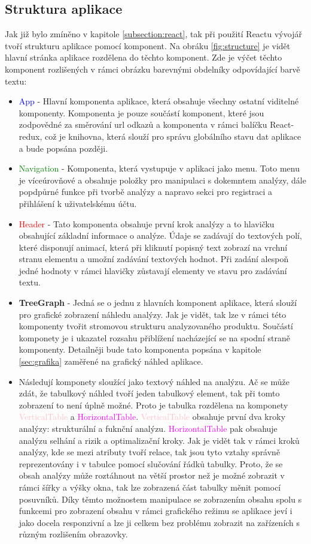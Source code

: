 \subsection{Struktura aplikace}
Jak již bylo zmíněno v kapitole \ref{subsection:react}, tak při použití Reactu vývojář tvoří strukturu aplikace pomocí komponent. Na obráku \ref{fig:structure} je vidět hlavní stránka aplikace rozdělena do těchto komponent. Zde je výčet těchto komponent rozlišených v rámci obrázku barevnými obdelníky odpovídající barvě textu: 

\begin{itemize}
    \item \textcolor{blue}{App} - Hlavní komponenta aplikace, která obsahuje všechny ostatní viditelné komponenty. Komponenta je pouze součástí komponent, které jsou zodpovědné za směrování url odkazů a komponenta v rámci balíčku React-redux, což je knihovna, která slouží pro správu globálního stavu dat aplikace a bude popsána později.  
    \item \textcolor{green}{Navigation} - Komponenta, která vystupuje v aplikaci jako menu. Toto menu je víceúrovňové a obsahuje položky pro manipulaci s dokemntem analýzy, dále popdpůrné funkce při tvorbě analýzy a napravo sekci pro registraci a přihlášení k uživatelskému účtu. 
    \item \textcolor{red}{Header} - Tato komponenta obsahuje první krok analýzy a to hlavičku obsahující základní informace o analýze. Údaje se zadávají do textových polí, které disponují animací, která při kliknutí popisný text zobrazí na vrchní stranu elementu a umožní zadávání textových hodnot. Při zadání alespoň jedné hodnoty v rámci hlavičky zůstavají elementy ve stavu pro zadávání textu.  
    \item \textbf{TreeGraph} - Jedná se o jednu z hlavních komponent aplikace, která slouží pro grafické zobrazení náhledu analýzy. Jak je vidět, tak lze v rámci této komponenty tvořit stromovou strukturu analyzovaného produktu. Součástí komponety je i ukazatel rozsahu přiblížení nacházející se na spodní straně komponenty. Detailněji bude tato komponenta popsána v kapitole \ref{sec:grafika} zaměřené na grafický náhled aplikace. 
    \item Následují komponety sloužící jako textový náhled na analýzu. Ač se může zdát, že tabulkový náhled tvoří jeden tabulkový element, tak při tomto zobrazení to není úplně možné. Proto je tabulka rozdělena na komponety \textcolor{pink}{VerticalTable} a \textcolor{magenta}{HorizontalTable}. \textcolor{pink}{VerticalTable} obsahuje první dva kroky analýzy: strukturální a fuknční analýzu. \textcolor{magenta}{HorizontalTable} pak obsahuje analýzu selhání a rizik a optimalizační kroky. Jak je vidět tak v rámci kroků analýzy, kde se mezi atributy tvoří relace, tak jsou tyto vztahy správně reprezentovány i v tabulce pomocí slučování řádků tabulky. Proto, že se obsah analýzy může roztáhnout na větší prostor než je možné zobrazit v rámci šířky a výšky okna, tak lze zobrazená část tabulky měnit pomocí posuvníků. Díky těmto možnostem manipulace se zobrazením obsahu spolu s funkcemi pro zobrazení obsahu v rámci grafického režimu se aplikace jeví i jako docela responzivní a lze ji celkem bez problému zobrazit na zařízeních s různým rozlišením obrazovky. 


\end{itemize}
